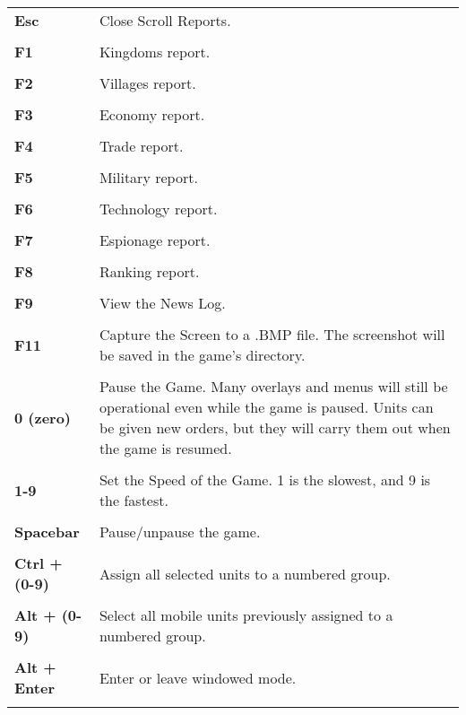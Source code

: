 \begin{longtable}{p{1in} p{3in}}
    \textbf{Esc} & Close Scroll Reports. \\ \\
    \textbf{F1} & Kingdoms report. \\ \\
    \textbf{F2} & Villages report. \\ \\
    \textbf{F3} & Economy report. \\ \\
    \textbf{F4} & Trade report. \\\\
    \textbf{F5} & Military report. \\ \\ 
    \textbf{F6} & Technology report. \\ \\
    \textbf{F7} & Espionage report. \\ \\
    \textbf{F8} & Ranking report. \\ \\
    \textbf{F9} & View the News Log. \\ \\
    \textbf{F11} & Capture the Screen to a .BMP file. The screenshot will be saved in the game’s directory. \\ \\
%
    \textbf{0 (zero)} & Pause the Game. Many overlays and menus will still be operational even while the game is paused. Units can be given new orders, but they will carry them out when the game is resumed.\\ \\
    \textbf{1-9} & Set the Speed of the Game. 1 is the slowest, and 9 is the fastest. \\ \\    
    \textbf{Spacebar} & Pause/unpause the game.\\ \\    
    \textbf{Ctrl + (0-9)} & Assign all selected units to a numbered group.\\ \\
    \textbf{Alt + (0-9)} & Select all mobile units previously assigned to a numbered group.\\ \\
    \textbf{Alt + Enter} & Enter or leave windowed mode.\\ \\

\end{longtable}
